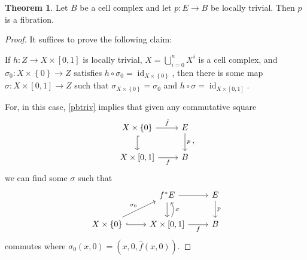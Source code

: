 \documentclass[10pt,letterpaper,cm]{nupset}
\theoremstyle{definition}
\theoremstyle{theorem}
\newtheorem{theorem}[defn]{Theorem}
\theoremstyle{remark}
\newcommand{\1}{\mathbb{1}}
\newcommand{\0}{\vec 0}
\DeclareMathOperator{\id}{id}
\begin{document}
\begin{theorem}
Let $B$ be a cell complex and let $p : E \to B$ be locally trivial. Then $p$ is a fibration. 
\end{theorem}
\begin{proof}
It suffices to prove the following claim: 
\begin{addmargin}[1em]{2em}

\smallskip

If $h : Z \to X \times \left[0,1\right]$ is locally trivial, $X = \bigcup_{i=0}^n X^i$ is a cell complex, and $\sigma_0 : X \times \left\{0\right\} \to Z$ satisfies $h \circ \sigma_0 = \id_{X \times \left\{0\right\}}$, then there is some map $\sigma : X \times \left[0,1\right] \to Z$ such that $\sigma_{X \times \left\{0\right\}} = \sigma_0$ and $h \circ \sigma = \id_{X \times \left[0,1\right]}$.
\end{addmargin}

\smallskip

For, in this case, \cref{pbtriv} implies that given any commutative square
\[
\begin{tikzcd}
X \times \left\{0\right\} \arrow[d, hook] \arrow[r, "\hat{f}"] & E \arrow[d, "p"] \\
{X \times \left[0,1\right]} \arrow[r, "f"']                    & B               
\end{tikzcd}
,\] we can find some $\sigma$ such that
\[
\begin{tikzcd}
                                                      & f^{\ast}{E} \arrow[r] \arrow[d]                                   & E \arrow[d, "p"] \\
X \times \left\{0\right\} \arrow[ru, "\sigma_0"] \arrow[r, hook] & {X \times \left[0,1\right]} \arrow[r, "f"'] \arrow[u, "\sigma"', bend right] & B               
\end{tikzcd}
\] commutes where $\sigma_0(x,0) = \left(x,0, \hat{f}(x,0)\right)$.

\medskip


\end{proof}
\end{document}
